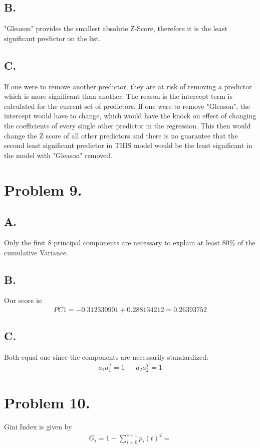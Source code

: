 \documentclass{article}
\begin{document}
\subsection*{B.}
"Gleason" provides the smallest absolute Z-Score, therefore it is the least significant predictor on the list.
\subsection*{C.}
If one were to remove another predictor, they are at risk of removing a predictor which is more significant than another. The reason is the intercept term is calculated for the current set of predictors. If one were to remove "Gleason", the intercept would have to change, which would have the knock on effect of changing the coefficients of every single other predictor in the regression. This then would change the Z score of all other predictors and there is no guarantee that the second least significant predictor in THIS model would be the least significant in the model with "Gleason" removed.
\clearpage

\section*{Problem 9.}
\subsection*{A.}
Only the first 8 principal components are necessary to explain at least 80\% of the cumulative Variance.
\subsection*{B.}
Our score is:
\begin{align*}
\boxed{ PC1 = -0.31233090 1 + 0.28813421 2 = 0.26393752 }
\end{align*}
\subsection*{C.}
Both equal one since the components are necessarily standardized:
\begin{align*}
a_1 a_1^T = 1 && a_2 a_2^T = 1
\end{align*}
\clearpage
\section*{Problem 10.}
Gini Index is given by
\begin{align*}
G_i = 1-\sum_{i=0}^{c-1} p_i(t)^2 = 
\end{align*}
\end{document}
